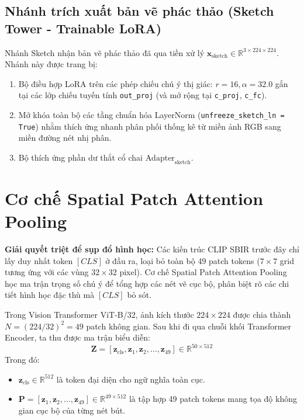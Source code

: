 \documentclass[12pt,a4paper]{report}
\begin{document}
\subsection{Nhánh trích xuất bản vẽ phác thảo (Sketch Tower - Trainable LoRA)}
Nhánh Sketch nhận bản vẽ phác thảo đã qua tiền xử lý $\mathbf{x}_{\text{sketch}} \in \mathbb{R}^{3 \times 224 \times 224}$. Nhánh này được trang bị:
\begin{enumerate}
    \item Bộ điều hợp LoRA trên các phép chiếu chú ý thị giác: $r=16, \alpha=32.0$ gắn tại các lớp chiếu tuyến tính \texttt{out\_proj} (và mở rộng tại \texttt{c\_proj}, \texttt{c\_fc}).
    \item Mở khóa toàn bộ các tầng chuẩn hóa LayerNorm (\texttt{unfreeze\_sketch\_ln = True}) nhằm thích ứng nhanh phân phối thống kê từ miền ảnh RGB sang miền đường nét nhị phân.
    \item Bộ thích ứng phần dư thắt cổ chai $\text{Adapter}_{\text{sketch}}$.
\end{enumerate}

\section{Cơ chế Spatial Patch Attention Pooling}
\begin{keyinsight}
    \textbf{Giải quyết triệt để sụp đổ hình học:} Các kiến trúc CLIP SBIR trước đây chỉ lấy duy nhất token $[CLS]$ ở đầu ra, loại bỏ toàn bộ 49 patch tokens ($7 \times 7$ grid tương ứng với các vùng $32 \times 32$ pixel). Cơ chế Spatial Patch Attention Pooling học ma trận trọng số chú ý để tổng hợp các nét vẽ cục bộ, phân biệt rõ các chi tiết hình học đặc thù mà $[CLS]$ bỏ sót.
\end{keyinsight}

Trong Vision Transformer ViT-B/32, ảnh kích thước $224 \times 224$ được chia thành $N = (224/32)^2 = 49$ patch không gian. Sau khi đi qua chuỗi khối Transformer Encoder, ta thu được ma trận biểu diễn:
\begin{equation}
    \mathbf{Z} = [\mathbf{z}_{\text{cls}}, \mathbf{z}_1, \mathbf{z}_2, \dots, \mathbf{z}_{49}] \in \mathbb{R}^{50 \times 512}
\end{equation}
Trong đó:
\begin{itemize}
    \item $\mathbf{z}_{\text{cls}} \in \mathbb{R}^{512}$ là token đại diện cho ngữ nghĩa toàn cục.
    \item $\mathbf{P} = [\mathbf{z}_1, \mathbf{z}_2, \dots, \mathbf{z}_{49}] \in \mathbb{R}^{49 \times 512}$ là tập hợp 49 patch tokens mang tọa độ không gian cục bộ của từng nét bút.
\end{itemize}
\end{document}

